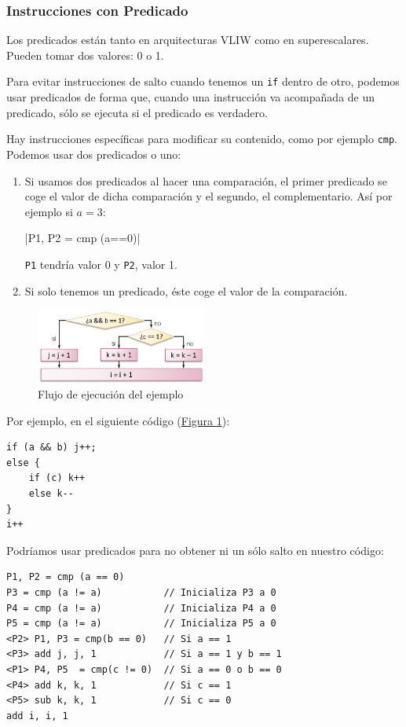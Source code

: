 \documentclass[10pt,a4paper,spanish]{report}
\begin{document}
\textcolor{azul}{\subsubsection{Instrucciones con Predicado}}
Los predicados están tanto en arquitecturas VLIW como en superescalares. Pueden tomar dos valores: 0 o 1.

Para evitar instrucciones de salto cuando tenemos un \verb*|if| dentro de otro, podemos usar predicados de forma que, cuando una instrucción va acompañada de un predicado, sólo se ejecuta si el predicado es verdadero.

Hay instrucciones específicas para modificar su contenido, como por ejemplo \verb*|cmp|. Podemos usar dos predicados o uno:
\begin{enumerate}[\color{azul}{$\heartsuit$}]
    \item Si usamos dos predicados al hacer una comparación, el primer predicado se coge el valor de dicha comparación y el segundo, el complementario. Así por ejemplo si $a=3$:

    |P1, P2 = cmp (a==0)|

    \verb*|P1| tendría valor 0 y \verb*|P2|, valor 1.

    \item Si solo tenemos un predicado, éste coge el valor de la comparación.
\end{enumerate}

\begin{figure}[!h]
\centering
\includegraphics[width=0.5\textwidth]{112}
\caption{Flujo de ejecución del ejemplo}
\label{flujo_ej}
\end{figure}

Por ejemplo, en el siguiente código (\hyperref[flujo_ej]{Figura \ref*{flujo_ej}}):

\begin{verbatim}
if (a && b) j++;
else {
    if (c) k++
    else k--
}
i++
\end{verbatim}

Podríamos usar predicados para no obtener ni un sólo salto en nuestro código:

\begin{verbatim}
P1, P2 = cmp (a == 0)
P3 = cmp (a != a)           // Inicializa P3 a 0
P4 = cmp (a != a)           // Inicializa P4 a 0
P5 = cmp (a != a)           // Inicializa P5 a 0
<P2> P1, P3 = cmp(b == 0)   // Si a == 1
<P3> add j, j, 1            // Si a == 1 y b == 1
<P1> P4, P5  = cmp(c != 0)  // Si a == 0 o b == 0
<P4> add k, k, 1            // Si c == 1
<P5> sub k, k, 1            // Si c == 0
add i, i, 1
\end{verbatim}
\end{document}
